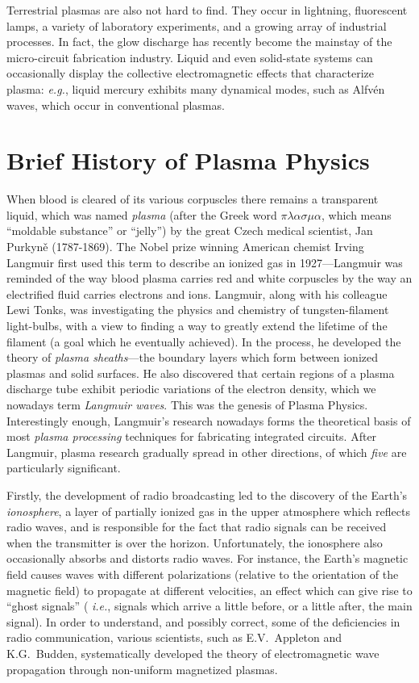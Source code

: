 Terrestrial plasmas are also  not hard to find. They occur in lightning,
fluorescent lamps, a variety of laboratory experiments, and a growing
array of industrial processes. In fact, the glow discharge has recently
become the mainstay of the micro-circuit fabrication industry. 
Liquid and even solid-state systems can occasionally display the
collective electromagnetic effects that characterize plasma:
{\em e.g.}, liquid mercury exhibits many dynamical modes, such
as Alfv\'{e}n waves,  which occur in conventional  plasmas. 

\section{Brief History of Plasma Physics}
When blood is cleared of its various corpuscles there remains a transparent liquid,
which was named {\em plasma}\/ (after the Greek word $\pi\lambda\alpha\sigma\mu\alpha$,
which means ``moldable substance'' or ``jelly'') by the great Czech medical
scientist, Jan Purkyn\v e (1787-1869). The Nobel prize winning
American chemist Irving Langmuir first used this term to describe an
ionized gas in 1927---Langmuir was reminded of the way blood plasma carries
red and white corpuscles by the way an electrified fluid carries
electrons and ions. Langmuir, along with his colleague Lewi Tonks, was 
investigating the physics and chemistry of tungsten-filament light-bulbs, with a view to finding a way to greatly
extend the lifetime of the filament (a goal which he
eventually achieved). In the process, he developed the theory of
 {\em plasma sheaths}---the
boundary layers which form between  ionized plasmas and  solid surfaces. 
He also  discovered that certain regions of
a plasma discharge tube exhibit periodic variations of the electron
density, which we nowadays term {\em Langmuir waves}. This was the
genesis of Plasma Physics. Interestingly enough,  
Langmuir's research 
 nowadays forms the theoretical basis of most {\em plasma processing}\/ techniques for
fabricating integrated circuits. 
After Langmuir, plasma research gradually spread in other
directions, of which {\em five}\/ are particularly significant.

Firstly, the development of radio broadcasting led to the discovery of
the Earth's {\em ionosphere}, a layer of partially ionized gas in the
upper atmosphere which reflects radio waves, and is responsible for the fact that
radio signals
 can be received when the transmitter is over the horizon. Unfortunately,
the ionosphere also occasionally absorbs and distorts radio waves. 
For instance, the Earth's
magnetic field causes waves  with different
polarizations (relative to the orientation of the magnetic field) to propagate at
different velocities, an effect which can give rise to ``ghost signals'' ({\em
i.e.}, signals which arrive a little before, or a little after, the main signal). 
In order to understand, and possibly correct, some of the deficiencies
in  radio communication,
various scientists, such as E.V.~Appleton and K.G.~Budden, systematically
developed the theory of 
electromagnetic wave propagation  through  non-uniform magnetized plasmas.

